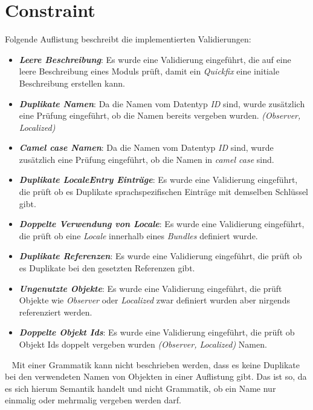 \section{Constraint}
Folgende Auflistung beschreibt die implementierten Validierungen:
\begin{itemize}
	\item\textbf{\emph{Leere Beschreibung}}: Es wurde eine Validierung eingeführt, die auf eine leere Beschreibung eines Moduls prüft, damit ein \emph{Quickfix} eine initiale Beschreibung erstellen kann.
	
	\item\textbf{\emph{Duplikate Namen}}: Da die Namen vom Datentyp \emph{ID} sind, wurde zusätzlich eine Prüfung eingeführt, ob die Namen bereits vergeben wurden. \emph{(Observer, Localized)}
	
	\item\textbf{\emph{Camel case Namen}}: Da die Namen vom Datentyp \emph{ID} sind, wurde zusätzlich eine Prüfung eingeführt, ob die Namen in \emph{camel case} sind.
	
	\item\textbf{\emph{Duplikate LocaleEntry Einträge}}: Es wurde eine Validierung eingeführt, die prüft ob es Duplikate sprachspezifischen Einträge mit demselben Schlüssel gibt.
	
	\item\textbf{\emph{Doppelte Verwendung von \emph{Locale}}}: Es wurde eine Validierung eingeführt, die prüft ob eine \emph{Locale} innerhalb eines \emph{Bundles} definiert wurde.
	
	\item\textbf{\emph{Duplikate Referenzen}}: Es wurde eine Validierung eingeführt, die prüft ob es Duplikate bei den gesetzten Referenzen gibt.
	
	\item\textbf{\emph{Ungenutzte Objekte}}: Es wurde eine Validierung eingeführt, die prüft Objekte wie \emph{Observer} oder \emph{Localized} zwar definiert wurden aber nirgends referenziert werden.
	
	\item\textbf{\emph{Doppelte Objekt Ids}}: Es wurde eine Validierung eingeführt, die prüft ob Objekt Ids doppelt vergeben wurden \emph{(Observer, Localized)} Namen.
\end{itemize}
\ \newline
Mit einer Grammatik kann nicht beschrieben werden, dass es keine Duplikate bei den verwendeten Namen von Objekten in einer Auflistung gibt. Das ist so, da es sich hierum Semantik handelt und nicht Grammatik, ob ein Name nur einmalig oder mehrmalig vergeben werden darf.
